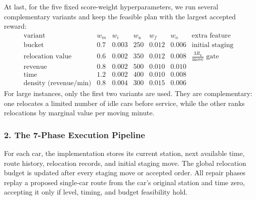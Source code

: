 \documentclass[10pt,a4paper]{article}
\begin{document}
At last, for the five fixed score-weight hyperparameters, we run several complementary variants and keep the feasible plan with the largest accepted reward:
\[
\begin{array}{c|ccccc|l}
\text{variant} & w_m & w_i & w_u & w_f & w_o & \text{extra feature}\\
\hline
\text{bucket} & 0.7 & 0.003 & 250 & 0.012 & 0.006 & \text{initial staging}\\
\text{relocation value} & 0.6 & 0.002 & 350 & 0.012 & 0.008
& \frac{3R_k}{\text{move}}\text{ gate}\\
\text{revenue} & 0.8 & 0.002 & 500 & 0.010 & 0.010\\
\text{time} & 1.2 & 0.002 & 400 & 0.010 & 0.008\\
\text{density (revenue/min)} & 0.8 & 0.004 & 300 & 0.015 & 0.006
\end{array}
\]
For large instances, only the first two variants are used.  They are
complementary: one relocates a limited number of idle cars before service, while
the other ranks relocations by marginal value per moving minute.

\subsubsection*{2. The 7-Phase Execution Pipeline}

For each car, the implementation stores its current station, next available
time, route history, relocation records, and initial staging move.  The global
relocation budget is updated after every staging move or accepted order.  All
repair phases replay a proposed single-car route from the car's original station
and time zero, accepting it only if level, timing, and budget feasibility hold.
\end{document}
